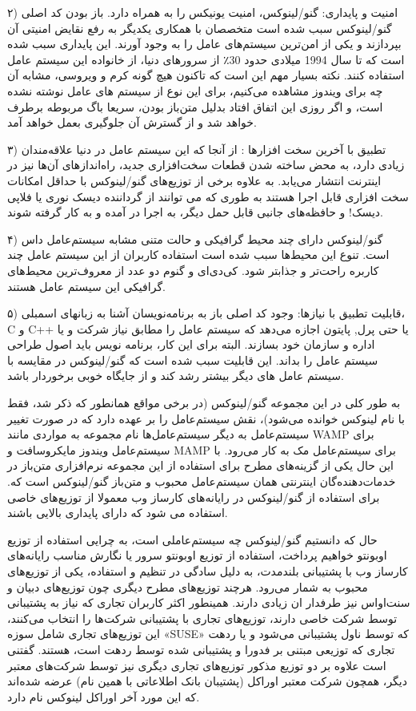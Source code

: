 ۲) امنیت و پایداری: گنو/لینوکس، امنیت یونیکس را به همراه دارد. باز بودن کد اصلی گنو/لینوکس سبب شده است متخصصان با همکاری یکدیگر به رفع نقایض امنیتی آن بپردازند و یکی از امن‌ترین سیستم‌های عامل را به وجود آورند. این پایداری سبب شده است که تا سال 1994 میلادی حدود 30٪ از سرورهای دنیا، از خانواده این سیستم عامل استفاده کنند. نکته بسیار مهم این است که تاکنون هیچ گونه کرم و ویروسی، مشابه آن چه برای ویندوز مشاهده می‌کنیم، برای این نوع از سیستم های عامل نوشته نشده است، و اگر روزی این اتفاق افتاد بدلیل متن‌باز بودن، سریعا باگ مربوطه برطرف خواهد شد و از گسترش آن جلوگیری بعمل خواهد آمد.

۳)  تطبیق با آخرین سخت افزارها : از آنجا که این سیستم عامل در دنیا علاقه‌مندان زیادی دارد، به محض ساخته شدن قطعات سخت‌افزاری جدید، راه‌اندازهای آن‌ها نیز در اینترنت انتشار می‌یابد. به علاوه برخی از توزیع‌های گنو/لینوکس با حداقل امکانات سخت افزاری قابل اجرا هستند به طوری که می توانند از گرداننده دیسک نوری یا فلاپی دیسک! و حافظه‌های جانبی قابل حمل دیگر، به اجرا در آمده و به کار گرفته شوند.

۴) گنو/لینوکس دارای چند محیط گرافیکی و حالت متنی مشابه سیستم‌عامل داس است. تنوع این محیط‌ها سبب شده است استفاده کاربران از این سیستم عامل چند کاربره راحت‌تر و جذابتر شود. کی‌دی‌ای و گنوم دو عدد از معروف‌ترین محیط‌های گرافیکی این سیستم عامل هستند.

۵) قابلیت تطبیق با نیازها: وجود کد اصلی باز به برنامه‌نویسان آشنا به زبانهای اسمبلی، C و C++ یا حتی پرل, پایتون اجازه می‌دهد که سیستم عامل را مطابق نیاز شرکت و یا اداره و سازمان خود بسازند. البته برای این کار، برنامه نویس باید اصول طراحی سیستم عامل را بداند. این قابلیت سبب شده است که گنو/لینوکس در مقایسه با سیستم عامل های دیگر بیشتر رشد کند و از جایگاه خوبی برخوردار باشد.

به طور کلی در این مجموعه گنو/لینوکس (در برخی مواقع همانطور که ذکر شد، فقط با نام لینوکس خوانده می‌شود)، نقش سیستم‌عامل را بر عهده دارد که در صورت تغییر سیستم‌عامل به دیگر سیستم‌عامل‌ها نام مجموعه به مواردی مانند WAMP برای سیستم‌عامل ویندوز مایکروسافت و MAMP برای سیستم‌عامل مک به کار می‌رود. با این حال یکی از گزینه‌های مطرح برای استفاده از این مجموعه نرم‌افزاری متن‌باز در خدمات‌دهنده‌گان اینترنتی همان سیستم‌عامل محبوب و متن‌باز گنو/لینوکس است که. برای استفاده از گنو/لینوکس در رایانه‌های کارساز وب  معمولا از توزیع‌های خاصی استفاده می شود که دارای پایداری بالایی باشند.

حال که دانستیم گنو/لینوکس چه سیستم‌عاملی است، به چرایی استفاده از توزیع اوبونتو خواهیم پرداخت، استفاده از توزیع اوبونتو سرور یا نگارش مناسب رایانه‌های کارساز وب با پشتیبانی بلند‌مدت، به دلیل سادگی در تنظیم و استفاده، یکی از توزیع‌های محبوب به شمار می‌رود. هرچند توزیع‌های مطرح دیگری چون توزیع‌های دبیان و سنت‌او‌اس نیز طرفدار ان زیادی دارند. همینطور اکثر کاربران تجاری که نیاز به پشتیبانی توسط شرکت خاصی دارند، توزیع‌های تجاری با پشتیبانی شرکت‌ها را انتخاب می‌کنند، این توزیع‌های تجاری شامل سوزه «SUSE» که توسط ناول پشتیبانی می‌شود و یا ردهت تجاری که توزیعی مبتنی بر فدورا و پشتیبانی شده توسط ردهت است، هستند. گفتنی است علاوه بر دو توزیع مذکور توزیع‌های تجاری دیگری نیز توسط شرکت‌های معتبر دیگر،  همچون شرکت معتبر اوراکل (پشتیبان بانک اطلاعاتی با همین نام) عرضه شده‌اند که این مورد آخر اوراکل لینوکس نام دارد.

